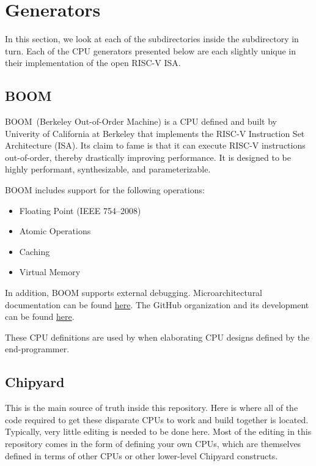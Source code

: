\section{Generators}\label{sec:Generators}
In this section, we look at each of the subdirectories inside the  subdirectory in turn.
Each of the CPU generators presented below are each slightly unique in their implementation of the open RISC-V ISA.\@

\subsection{BOOM}\label{sec:BOOM_Generator}
\nocite{boomHomepage}
\nocite{boomPaper}
BOOM~(Berkeley Out-of-Order Machine) is a CPU defined and built by Univerity of California at Berkeley that implements the RISC-V Instruction Set Architecture (ISA).
Its claim to fame is that it can execute RISC-V instructions out-of-order, thereby drastically improving performance.
It is designed to be highly performant, synthesizable, and parameterizable.

BOOM includes support for the following operations:
\begin{itemize}
\item Floating Point (IEEE 754--2008)
\item Atomic Operations
\item Caching
\item Virtual Memory
\end{itemize}
In addition, BOOM supports external debugging.
Microarchitectural documentation can be found \href{https://docs.boom-core.org/en/latest/}{here}.
The GitHub organization and its development can be found \href{https://github.com/riscv-boom}{here}.

These CPU definitions are used by  when elaborating CPU designs defined by the end-programmer.

\subsection{Chipyard}\label{sec:Chipyard_Generator}
This is the main source of truth inside this repository.
Here is where all of the code required to get these disparate CPUs to work and build together is located.
Typically, very little editing is needed to be done here.
Most of the editing in this repository comes in the form of defining your own CPUs, which are themselves defined in terms of other CPUs or other lower-level Chipyard constructs.

